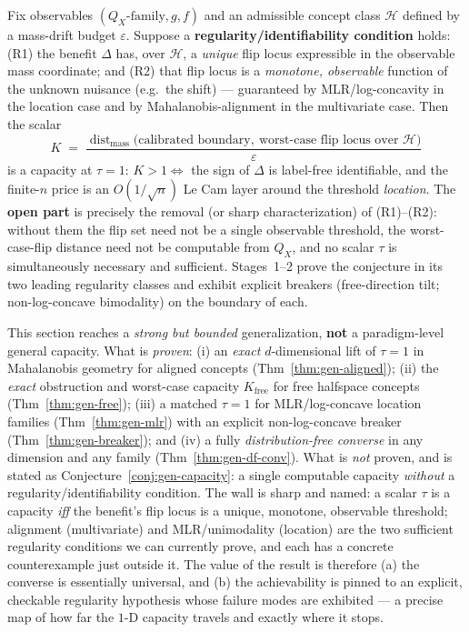 \begin{conjecture}
\label{conj:gen-capacity}
Fix observables $(Q_X\text{-family},g,f)$ and an admissible concept class $\mathcal H$
defined by a mass-drift budget $\varepsilon$. Suppose a \textbf{regularity/identifiability
condition} holds: \textnormal{(R1)} the benefit $\Delta$ has, over $\mathcal H$, a
\emph{unique} flip locus expressible in the observable mass coordinate; and
\textnormal{(R2)} that flip locus is a \emph{monotone, observable} function of the
unknown nuisance (e.g.\ the shift) --- guaranteed by MLR/log-concavity in the location
case and by Mahalanobis-alignment in the multivariate case. Then the scalar
\[
  K\;=\;\frac{\operatorname{dist}_{\text{mass}}\!\big(\text{calibrated boundary},\ \text{worst-case flip locus over }\mathcal H\big)}{\varepsilon}
\]
is a capacity at $\tau=1$: $K>1\iff$ the sign of $\Delta$ is label-free identifiable,
and the finite-$n$ price is an $O(1/\sqrt n)$ Le Cam layer around the threshold
\emph{location}. The \textbf{open part} is precisely the removal (or sharp
characterization) of \textnormal{(R1)--(R2)}: without them the flip set need not be a
single observable threshold, the worst-case-flip distance need not be computable from
$Q_X$, and no scalar $\tau$ is simultaneously necessary and sufficient. Stages~1--2
prove the conjecture in its two leading regularity classes and exhibit explicit
breakers (free-direction tilt; non-log-concave bimodality) on the boundary of each.
\end{conjecture}

\begin{remark}\label{rmk:gen-scope}
This section reaches a \emph{strong but bounded} generalization, \textbf{not} a
paradigm-level general capacity. What is \emph{proven}: (i) an \emph{exact}
$d$-dimensional lift of $\tau=1$ in Mahalanobis geometry for aligned concepts
(Thm~\ref{thm:gen-aligned}); (ii) the \emph{exact} obstruction and worst-case capacity
$K_{\mathrm{free}}$ for free halfspace concepts (Thm~\ref{thm:gen-free}); (iii) a
matched $\tau=1$ for MLR/log-concave location families (Thm~\ref{thm:gen-mlr}) with an
explicit non-log-concave breaker (Thm~\ref{thm:gen-breaker}); and (iv) a fully
\emph{distribution-free converse} in any dimension and any family
(Thm~\ref{thm:gen-df-conv}). What is \emph{not} proven, and is stated as
Conjecture~\ref{conj:gen-capacity}: a single computable capacity \emph{without} a
regularity/identifiability condition. The wall is sharp and named: a scalar $\tau$ is a
capacity \emph{iff} the benefit's flip locus is a unique, monotone, observable
threshold; alignment (multivariate) and MLR/unimodality (location) are the two
sufficient regularity conditions we can currently prove, and each has a concrete
counterexample just outside it. The value of the result is therefore (a) the converse
is essentially universal, and (b) the achievability is pinned to an explicit,
checkable regularity hypothesis whose failure modes are exhibited --- a precise map of
how far the $1$-D capacity travels and exactly where it stops.
\end{remark}

